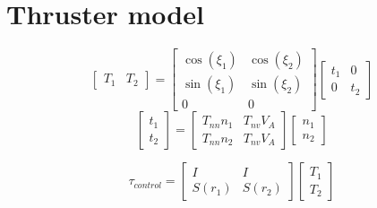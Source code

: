 \documentclass[12pt,a4]{article}
\begin{document}
\section{Thruster model}

\begin{equation}
	\begin{bmatrix} T_1 & T_2 \end{bmatrix} = \begin{bmatrix} \cos(\xi_1) & \cos(\xi_2) \\ \sin(\xi_1) & \sin(\xi_2) \\ 0 & 0\end{bmatrix}\begin{bmatrix} t_1 & 0 \\ 0 & t_2 \end{bmatrix}
\end{equation}
\begin{equation}
	\begin{bmatrix} t_1 \\ t_2 \end{bmatrix} = \begin{bmatrix} T_{nn}n_1 & T_{nv}V_A \\ T_{nn}n_2 & T_{nv}V_A \end{bmatrix}\begin{bmatrix} n_1 \\ n_2 \end{bmatrix}
\end{equation}

\begin{equation}
	\tau_{control} = \begin{bmatrix} I & I \\ S(r_1) & S(r_2) \end{bmatrix}\begin{bmatrix} T_1 \\ T_2 \end{bmatrix}
\end{equation}
\end{document}
